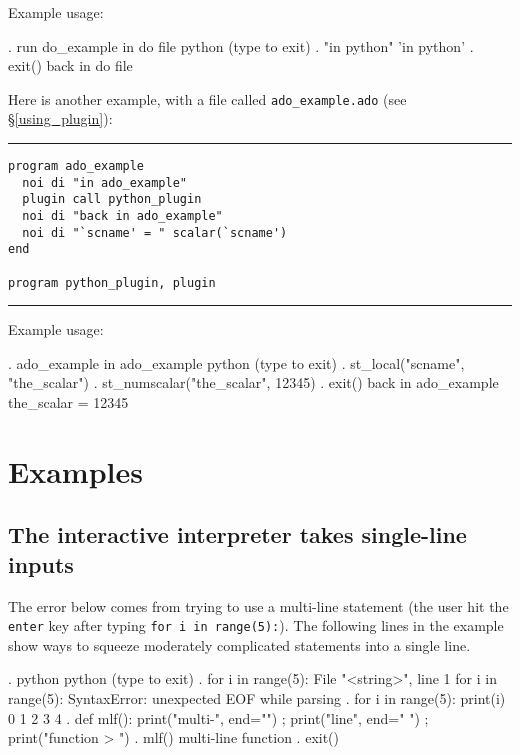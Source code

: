 \documentclass{article}
\begin{document}
\vspace{5mm}
\noindent Example usage:
\begin{stlog}
{\smallskip}
. run do_example
in do file
 python (type {} to exit) 
{\bftt{>>>}}. "in python"
'in python'
{\smallskip}
{\bftt{>>>}}. exit()
back in do file
\end{stlog}

\vspace{5mm}
\noindent Here is another example, with a file called \lstinline{ado_example.ado} (see \S\ref{using_plugin}): \newline

\hrule
\begin{lstlisting}
program ado_example
  noi di "in ado_example"
  plugin call python_plugin
  noi di "back in ado_example"
  noi di "`scname' = " scalar(`scname')
end

program python_plugin, plugin
\end{lstlisting}
\hrule

\medskip

\noindent Example usage:

\medskip

\begin{stlog}
. ado_example
in ado_example
 python (type {} to exit) 
{\bftt{>>>}}. st_local("scname", "the_scalar")
{\smallskip}
{\bftt{>>>}}. st_numscalar("the_scalar", 12345)
{\smallskip}
{\bftt{>>>}}. exit()
back in ado_example
the_scalar = 12345
\end{stlog}

	
	
\section{Examples} \label{examples}
	
\subsection{The interactive interpreter takes single-line inputs} \label{single_line_example}

The error below comes from trying to use a multi-line statement (the user hit the \lstinline$enter$ key after typing \lstinline$for i in range(5):$). The following lines in the example show ways to squeeze moderately complicated statements into a single line.

\smallskip

\begin{stlog}
. python
 python (type {} to exit) 
{\bftt{>>>}}. for i in range(5):
{\color{red}  File "<string>", line 1
    for i in range(5):
                     {\caret}
SyntaxError: unexpected EOF while parsing}
{\smallskip}
{\bftt{>>>}}. for i in range(5): print(i)
0
1
2
3
4
{\smallskip}
{\bftt{>>>}}. def mlf(): print("multi-", end="") ; print("line", end=" ") ; print("function
> ")
{\smallskip}
{\bftt{>>>}}. mlf()
multi-line function
{\smallskip}
{\bftt{>>>}}. exit()
\end{stlog}
\end{document}
